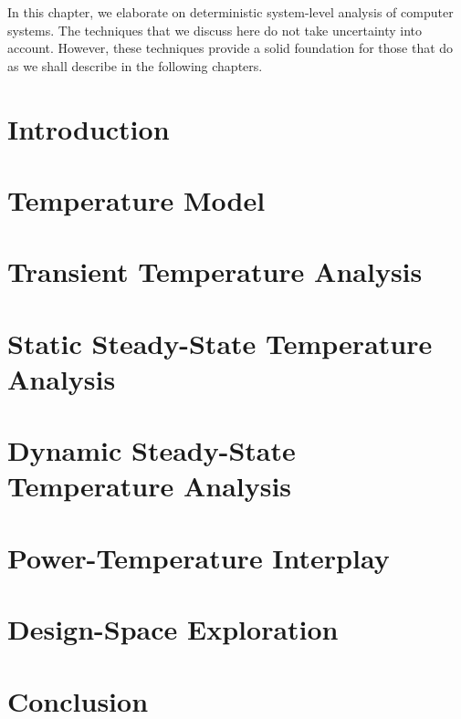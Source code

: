 In this chapter, we elaborate on deterministic system-level analysis of computer
systems. The techniques that we discuss here do not take uncertainty into
account. However, these techniques provide a solid foundation for those that do
as we shall describe in the following chapters.

\section{Introduction}

\section{Temperature Model}

\section{Transient Temperature Analysis}

\section{Static Steady-State Temperature Analysis}

\section{Dynamic Steady-State Temperature Analysis}

\section{Power-Temperature Interplay}

\section{Design-Space Exploration}

\section{Conclusion}
